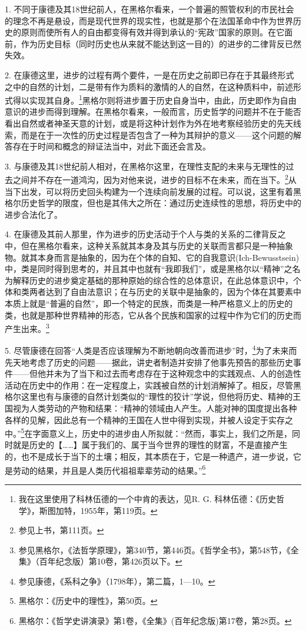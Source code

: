 1. 不同于康德及其18世纪前人，在黑格尔看来，一个普遍的照管权利的市民社会的理念不再是悬设，而是现代世界的现实性，也就是那个在法国革命中作为世界历史的原则而使所有人的自由都变得有效并得到承认的“宪政”国家的原则。在它面前，作为历史目标（同时历史也从来就不能达到这一目的）的进步的二律背反已然失效。

2. 在康德这里，进步的过程有两个要件，一是在历史之前即已存在于其最终形式之中的自然的计划，二是带有作为质料的激情的人的自然，在这种质料中，前述形式得以实现其自身。\footnote{我在这里使用了科林伍德的一个中肯的表达，见R. G. 科林伍德：《历史哲学》，斯图加特，1955年，第119页。}黑格尔则将进步置于历史自身当中，由此，历史即作为自由意识的进步而得到理解。在黑格尔看来，一般而言，历史哲学的问题并不在于能否看出自然或者神圣天意的计划，或是将这种计划作为外在地考察经验历史的先天线索，而是在于一次性的历史过程是否包含了一种为其辩护的意义——这个问题的解答存在于时间和概念的辩证法当中，对此下面还会言及。

3. 与康德及其18世纪前人相对，在黑格尔这里，在理性支配的未来与无理性的过去之间并不存在一道鸿沟，因为对他来说，进步的目标不在未来，而在当下。\footnote{参见上书，第111页。}从当下出发，可以将历史回头构建为一个连续向前发展的过程。可以说，这里有着黑格尔历史哲学的限度，但也是其伟大之所在：通过历史连续性的思想，将历史中的进步合法化了。

4. 在康德及其前人那里，作为进步的历史活动于个人与类的关系的二律背反之中，但在黑格尔看来，这种关系就其本身及其与历史的关联而言都只是一种抽象物。就其本身而言是抽象的，因为在个体的自知、它的自我意识(Ich-Bewusstsein)中，类是同时得到思考的，并且其中也就有“我即我们”，或是黑格尔以“精神”之名为解释历史的进步奠定基础的那种原始的综合性的总体意识，在此总体意识中，个体和类两者达到了自由法意识；在与历史的关联中是抽象的，因为个体在其要素中本质上就是“普遍的自然”，即一个特定的民族，而类是一种严格意义上的历史的类，也就是那种世界精神的形态，它从各个民族和国家的过程中作为它们的历史而产生出来。\footnote{参见黑格尔，《法哲学原理》，第340节，第446页。《哲学全书》，第548节，《全集》（百年纪念版）第10卷，第426页以下。}

5. 尽管康德在回答“人类是否应该理解为不断地朝向改善而进步”时，\footnote{参见康德，《系科之争》（1798年），第二篇，1—10。}为了未来而先天地考虑了历史的问题——据此，讲史者制造并安排了他事先预告的那些历史事件——但他并未为了当下和过去而考虑存在于这种观念中的实践观点、人的创造性活动在历史中的作用：在一定程度上，实践被自然的计划消解掉了。相反，尽管黑格尔这里也有与康德的自然计划类似的“理性的狡计”学说，但他将历史、精神的王国视为人类劳动的产物和结果：“精神的领域由人产生。人能对神的国度提出各种各样的见解，因此总有一个精神的王国在人世中得到实现，并被人设定于实存之中。”\footnote{黑格尔：《历史中的理性》，第50页。}在字面意义上，历史中的进步由人所拟就：“然而，事实上，我们之所是，同时就是历史的【……】属于我们的、属于当今世界的理性的财富，不是直接产生的，也不是成长于当下的土壤；相反，其本质在于，它是一种遗产，进一步说，它是劳动的结果，并且是人类历代祖祖辈辈劳动的结果。”\footnote{黑格尔：《哲学史讲演录》第1卷，《全集》(百年纪念版)第17卷，第28页。}

